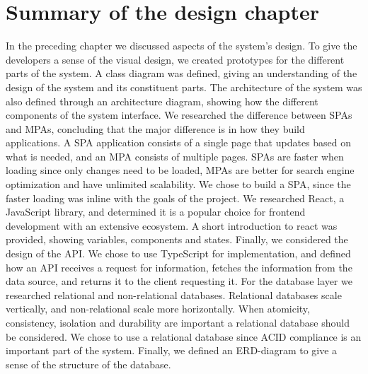 \section{Summary of the design chapter}
In the preceding chapter we discussed aspects of the system's design.
To give the developers a sense of the visual design, we created prototypes for the different parts of the system.
A class diagram was defined, giving an understanding of the design of the system and its constituent parts.
The architecture of the system was also defined through an architecture diagram, showing how the different components of the system interface.
We researched the difference between SPAs and MPAs, concluding that the major difference is in how they build applications.
A SPA application consists of a single page that updates based on what is needed, and an MPA consists of multiple pages.
SPAs are faster when loading since only changes need to be loaded, MPAs are better for search engine optimization and have unlimited scalability.
We chose to build a SPA, since the faster loading was inline with the goals of the project. 
We researched React, a JavaScript library, and determined it is a popular choice for frontend development with an extensive ecosystem.
A short introduction to react was provided, showing variables, components and states.
Finally, we considered the design of the API.
We chose to use TypeScript for implementation, and defined how an API receives a request for information, fetches the information from the data source, and returns it to the client requesting it.
For the database layer we researched relational and non-relational databases.
Relational databases scale vertically, and non-relational scale more horizontally.
When atomicity, consistency, isolation and durability are important a relational database should be considered.
We chose to use a relational database since ACID compliance is an important part of the system.
Finally, we defined an ERD-diagram to give a sense of the structure of the database.
